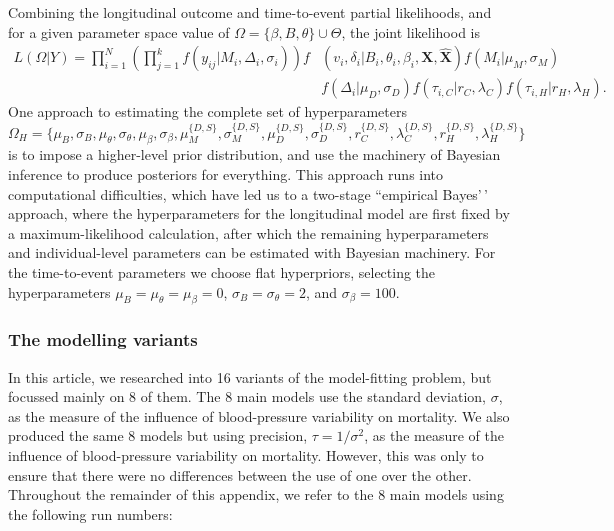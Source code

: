 \documentclass[
]{article}
\begin{document}
Combining the longitudinal outcome and time-to-event partial
likelihoods, and for a given parameter space value of
\(\Omega=\{\beta,B,\theta\}\cup \Theta\), the joint likelihood is
\begin{equation}
\begin{split}
  L(\Omega|Y)=\prod_{i=1}^N\left(\prod_{j=1}^{k}f(y_{ij}|M_i,\Delta_i,\sigma_i)\right)f&(v_i,\delta_i|B_i,\theta_i,\beta_i,\boldsymbol{X},\hat{\boldsymbol{X}})f(M_i|\mu_M,\sigma_M)\\
  &f(\Delta_i|\mu_D,\sigma_D)f(\tau_{i,C}|r_C,\lambda_C)f(\tau_{i,H}|r_H,\lambda_H).
  \end{split}
\end{equation} One approach to estimating the complete set of
hyperparameters \begin{equation}
  \Omega_H=\{\mu_B,\sigma_B,\mu_\theta,\sigma_\theta,\mu_\beta,\sigma_\beta,\mu_M^{\{D,S\}},\sigma_M^{\{D,S\}},\mu_D^{\{D,S\}},\sigma_D^{\{D,S\}},r_C^{\{D,S\}},\lambda_C^{\{D,S\}},r_H^{\{D,S\}},\lambda_H^{\{D,S\}}\}
\end{equation} is to impose a higher-level prior distribution, and use
the machinery of Bayesian inference to produce posteriors for
everything. This approach runs into computational difficulties, which
have led us to a two-stage ``empirical Bayes'\,' approach, where the
hyperparameters for the longitudinal model are first fixed by a
maximum-likelihood calculation, after which the remaining
hyperparameters and individual-level parameters can be estimated with
Bayesian machinery. For the time-to-event parameters we choose flat
hyperpriors, selecting the hyperparameters
\(\mu_B=\mu_\theta=\mu_\beta=0\), \(\sigma_B=\sigma_\theta=2\), and
\(\sigma_\beta=100\).

\hypertarget{the-modelling-variants}{%
\subsubsection{The modelling variants}\label{the-modelling-variants}}

In this article, we researched into 16 variants of the model-fitting
problem, but focussed mainly on 8 of them. The 8 main models use the
standard deviation, \(\sigma\), as the measure of the influence of
blood-pressure variability on mortality. We also produced the same 8
models but using precision, \(\tau=1/\sigma^2\), as the measure of the
influence of blood-pressure variability on mortality. However, this was
only to ensure that there were no differences between the use of one
over the other. Throughout the remainder of this appendix, we refer to
the 8 main models using the following run numbers:
\end{document}
